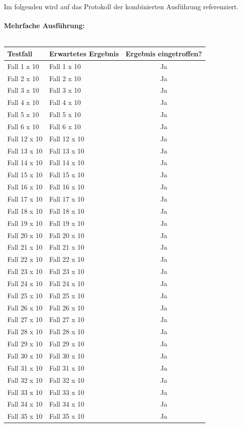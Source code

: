 \newpage
Im folgenden wird auf das Protokoll der kombinierten Ausführung referenziert.\ \\ \\
\textbf{Mehrfache Ausführung:}\ \\ \\
\begin{tabular}[c]{|p{6cm}|p{6cm}|c|}
\hline
\textbf{Testfall} & \textbf{Erwartetes Ergebnis} & \textbf{Ergebnis eingetroffen?}\\
\hline
Fall 1 x 10 & Fall 1 x 10 & Ja\\
\hline
Fall 2 x 10 & Fall 2 x 10 & Ja\\
\hline
Fall 3 x 10 & Fall 3 x 10 & Ja\\
\hline
Fall 4 x 10 & Fall 4 x 10 & Ja\\
\hline
Fall 5 x 10 & Fall 5 x 10 & Ja\\
\hline
Fall 6 x 10 & Fall 6 x 10 & Ja\\
\hline
Fall 12 x 10 & Fall 12 x 10 & Ja\\
\hline
Fall 13 x 10 & Fall 13 x 10 & Ja\\
\hline
Fall 14 x 10 & Fall 14 x 10 & Ja\\
\hline
Fall 15 x 10 & Fall 15 x 10 & Ja\\
\hline
Fall 16 x 10 & Fall 16 x 10 & Ja\\
\hline
Fall 17 x 10 & Fall 17 x 10 & Ja\\
\hline
Fall 18 x 10 & Fall 18 x 10 & Ja\\
\hline
Fall 19 x 10 & Fall 19 x 10 & Ja\\
\hline
Fall 20 x 10 & Fall 20 x 10 & Ja\\
\hline
Fall 21 x 10 & Fall 21 x 10 & Ja\\
\hline
Fall 22 x 10 & Fall 22 x 10 & Ja\\
\hline
Fall 23 x 10 & Fall 23 x 10 & Ja\\
\hline
Fall 24 x 10 & Fall 24 x 10 & Ja\\
\hline
Fall 25 x 10 & Fall 25 x 10 & Ja\\
\hline
Fall 26 x 10 & Fall 26 x 10 & Ja\\
\hline
Fall 27 x 10 & Fall 27 x 10 & Ja\\
\hline
Fall 28 x 10 & Fall 28 x 10 & Ja\\
\hline 
Fall 29 x 10 & Fall 29 x 10 & Ja\\
\hline
Fall 30 x 10 & Fall 30 x 10 & Ja\\
\hline
Fall 31 x 10 & Fall 31 x 10 & Ja\\
\hline
Fall 32 x 10 & Fall 32 x 10 & Ja\\
\hline
Fall 33 x 10 & Fall 33 x 10 & Ja\\
\hline
Fall 34 x 10 & Fall 34 x 10 & Ja\\
\hline
Fall 35 x 10 & Fall 35 x 10 & Ja\\
\hline
\end{tabular}

